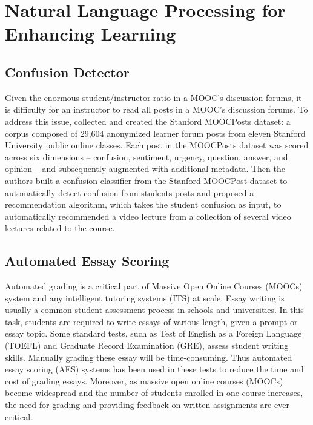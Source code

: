\documentclass{article}
\begin{document}
\section{Natural Language Processing for Enhancing Learning}
\subsection{Confusion Detector}
Given the enormous student/instructor ratio in a MOOC's discussion
forums, it is difficulty for an instructor to read all posts in a
MOOC's discussion forums. To address this issue, \cite{Agrawal2015-hp}
collected and created the Stanford MOOCPosts dataset: a corpus
composed of 29,604 anonymized learner forum posts from eleven Stanford
University public online classes. Each post in the MOOCPosts dataset
was scored across six dimensions -- confusion, sentiment, urgency,
question, answer, and opinion -- and subsequently augmented with
additional metadata. Then the authors built a confusion classifier from
the Stanford MOOCPost dataset to automatically detect confusion from
students posts and proposed a recommendation algorithm, which takes the
student confusion as input, to automatically recommended a
video lecture from a collection of several video lectures related to
the course.
\subsection{Automated Essay Scoring}
Automated grading is a critical part of Massive Open Online Courses (MOOCs) system and any intelligent tutoring systems (ITS) at scale. Essay writing is usually a common student assessment process in schools and universities. In this task, students are required to write essays of various length, given a prompt or essay topic. Some standard tests, such as Test of English as a Foreign Language (TOEFL) and Graduate Record Examination (GRE), assess student writing skills. Manually grading these essay will be time-consuming. Thus automated essay scoring (AES) systems has been used in these tests to reduce the time and cost of grading essays. Moreover, as massive open online courses (MOOCs) become widespread and the number of students enrolled in one course increases, the need for grading and providing feedback on written assignments are ever critical.
\end{document}
